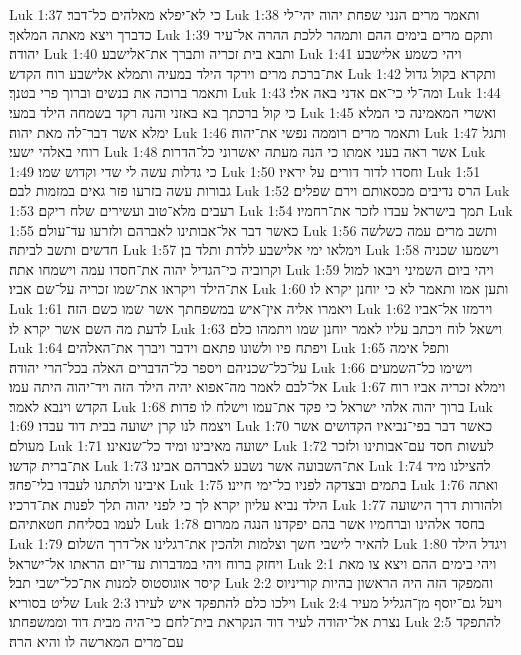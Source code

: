 Luk 1:37  כי לא־יפלא מאלהים כל־דבר׃
Luk 1:38  ותאמר מרים הנני שפחת יהוה יהי־לי כדברך ויצא מאתה המלאך׃
Luk 1:39  ותקם מרים בימים ההם ותמהר ללכת ההרה אל־עיר יהודה׃
Luk 1:40  ותבא בית זכריה ותברך את־אלישבע׃
Luk 1:41  ויהי כשמע אלישבע את־ברכת מרים וירקד הילד במעיה ותמלא אלישבע רוח הקדש׃
Luk 1:42  ותקרא בקול גדול ותאמר ברוכה את בנשים וברוך פרי בטנך׃
Luk 1:43  ומה־לי כי־אם אדני באה אלי׃
Luk 1:44  כי קול ברכתך בא באזני והנה רקד בשמחה הילד במעי׃
Luk 1:45  ואשרי המאמינה כי המלא ימלא אשר דבר־לה מאת יהוה׃
Luk 1:46  ותאמר מרים רוממה נפשי את־יהוה׃
Luk 1:47  ותגל רוחי באלהי ישעי׃
Luk 1:48  אשר ראה בעני אמתו כי הנה מעתה יאשרוני כל־הדרות׃
Luk 1:49  כי גדלות עשה לי שדי וקדוש שמו׃
Luk 1:50  וחסדו לדור דורים על יראיו׃
Luk 1:51  גבורות עשה בזרעו פזר גאים במזמות לבם׃
Luk 1:52  הרס נדיבים מכסאותם וירם שפלים׃
Luk 1:53  רעבים מלא־טוב ועשירים שלח ריקם׃
Luk 1:54  תמך בישראל עבדו לזכר את־רחמיו׃
Luk 1:55  כאשר דבר אל־אבותינו לאברהם ולזרעו עד־עולם׃
Luk 1:56  ותשב מרים עמה כשלשה חדשים ותשב לביתה׃
Luk 1:57  וימלאו ימי אלישבע ללדת ותלד בן׃
Luk 1:58  וישמעו שכניה וקרוביה כי־הגדיל יהוה את־חסדו עמה וישמחו אתה׃
Luk 1:59  ויהי ביום השמיני ויבאו למול את־הילד ויקראו את־שמו זכריה על־שם אביו׃
Luk 1:60  ותען אמו ותאמר לא כי יוחנן יקרא לו׃
Luk 1:61  ויאמרו אליה אין־איש במשפחתך אשר שמו כשם הזה׃
Luk 1:62  וירמזו אל־אביו לדעת מה השם אשר יקרא לו׃
Luk 1:63  וישאל לוח ויכתב עליו לאמר יוחנן שמו ויתמהו כלם׃
Luk 1:64  ויפתח פיו ולשונו פתאם וידבר ויברך את־האלהים׃
Luk 1:65  ותפל אימה על־כל־שכניהם ויספר כל־הדברים האלה בכל־הרי יהודה׃
Luk 1:66  וישימו כל־השמעים אל־לבם לאמר מה־אפוא יהיה הילד הזה ויד־יהוה היתה עמו׃
Luk 1:67  וימלא זכריה אביו רוח הקדש וינבא לאמר׃
Luk 1:68  ברוך יהוה אלהי ישראל כי פקד את־עמו וישלח לו פדות׃
Luk 1:69  ויצמח לנו קרן ישועה בבית דוד עבדו׃
Luk 1:70  כאשר דבר בפי־נביאיו הקדושים אשר מעולם׃
Luk 1:71  ישועה מאיבינו ומיד כל־שנאינו׃
Luk 1:72  לעשות חסד עם־אבותינו ולזכר את־ברית קדשו׃
Luk 1:73  את־השבועה אשר נשבע לאברהם אבינו׃
Luk 1:74  להצילנו מיד איבינו ולתתנו לעבדו בלי־פחד׃
Luk 1:75  בתמים ובצדקה לפניו כל־ימי חיינו׃
Luk 1:76  ואתה הילד נביא עליון יקרא לך כי לפני יהוה תלך לפנות את־דרכיו׃
Luk 1:77  ולהורות דרך הישועה לעמו בסליחת חטאתיהם׃
Luk 1:78  בחסד אלהינו וברחמיו אשר בהם יפקדנו הנגה ממרום׃
Luk 1:79  להאיר לישבי חשך וצלמות ולהכין את־רגלינו אל־דרך השלום׃
Luk 1:80  ויגדל הילד ויחזק ברוח ויהי במדברות עד־יום הראתו אל־ישראל׃
Luk 2:1  ויהי בימים ההם ויצא צו מאת קיסר אוגוסטוס למנות את־כל־ישבי תבל׃
Luk 2:2  והמפקד הזה היה הראשון בהיות קוריניוס שליט בסוריא׃
Luk 2:3  וילכו כלם להתפקד איש לעירו׃
Luk 2:4  ויעל גם־יוסף מן־הגליל מעיר נצרת אל־יהודה לעיר דוד הנקראת בית־לחם כי־היה מבית דוד וממשפחתו׃
Luk 2:5  להתפקד עם־מרים המארשה לו והיא הרה׃
